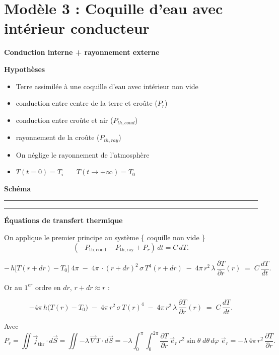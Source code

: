 \documentclass[a4paper,12pt]{article}
\begin{document}
\section{Modèle 3 : Coquille d’eau avec intérieur conducteur }
{\LARGE \textbf{Conduction interne + rayonnement externe}}
\textbf{Hypothèses}
\begin{itemize}
    \item Terre assimilée à une coquille d'eau avec intérieur non vide 
    \item  conduction entre centre de la terre et croûte (\(P_r\))
    \item  conduction entre croûte et air (\(P_{th,cond}\))
    \item  rayonnement de la croûte (\(P_{th,ray}\))
    \item On néglige le rayonnement de l'atmosphère
    \item $T(t=0) = T_i$ \ \ \
$T(t \to +\infty) = T_0$
     
\end{itemize}

\vspace{0.5cm}
\textbf{Schéma}
\\
\noindent\textcolor{gray}{\rule{\linewidth}{0.4pt}}

    
\begin{center}
  
\end{center}
\noindent\textcolor{gray}{\rule{\linewidth}{0.4pt}}

\textbf{Équations de transfert thermique}

On applique le premier principe au système \{ coquille non vide  \}
\[
(-P_{\mathrm{th,cond}} - P_{\mathrm{th,ray}} + P_r)\,dt = C\,dT.
\]

\[
-\,h\bigl[T(r+dr)-T_0\bigr]\;4\pi
\;-\;4\pi\,\cdot (r+dr)^2\,\sigma\,T^4(r+dr)
\;-\;4\pi\,r^2\,\lambda\,\frac{\partial T}{\partial r}(r)
\;=\;C\,\frac{dT}{dt}.
\]

\medskip

Or au \(1^{er}\) ordre en \(dr\), \(r+dr\approx r\) :

\[
-4\pi\,h\bigl(T(r)-T_0\bigr)
\;-\;4\pi\,r^2\,\sigma\,T(r)^4
\;-\;4\pi\,r^2\,\lambda\,\frac{\partial T}{\partial r}(r)
\;=\;C\,\frac{dT}{dt}.
\]

\medskip

Avec
\[
P_{r}
= \iint\vec j_{\mathrm{thr}}\cdot d\vec S
= \iint -\lambda\,\vec{ \nabla } T\cdot d\vec S
= -\lambda
  \int_{0}^{\pi}\!\!\int_{0}^{2\pi}
    \frac{\partial T}{\partial r}\,\vec e_{r}\,
    r^2\sin\theta\;d\theta\,d\varphi\;\vec e_{r}
= -\lambda\,4\pi\,r^2\,\frac{\partial T}{\partial r}.
\]
\end{document}
